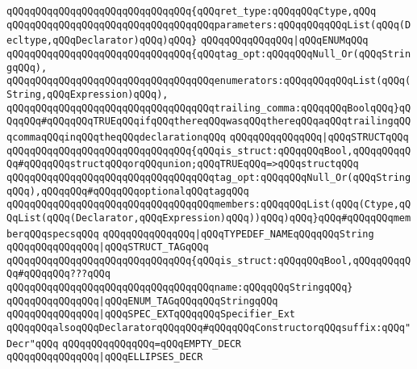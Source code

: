 \verb|qQQqqQQqqQQqqQQqqQQqqQQqqQQqqQQq{qQQqret_type:qQQqqQQqCtype,qQQq|\newline
\verb|qQQqqQQqqQQqqQQqqQQqqQQqqQQqqQQqqQQqparameters:qQQqqQQqqQQqList(qQQq(Decltype,qQQqDeclarator)qQQq)qQQq}|\newline
\verb|qQQqqQQqqQQqqQQq|\verb#|qQQqENUMqQQq#\newline
\verb|qQQqqQQqqQQqqQQqqQQqqQQqqQQqqQQq{qQQqtag_opt:qQQqqQQqNull_Or(qQQqStringqQQq),|\newline
\verb|qQQqqQQqqQQqqQQqqQQqqQQqqQQqqQQqqQQqenumerators:qQQqqQQqqQQqList(qQQq(String,qQQqExpression)qQQq),|\newline
\verb|qQQqqQQqqQQqqQQqqQQqqQQqqQQqqQQqqQQqtrailing_comma:qQQqqQQqBoolqQQq}qQQqqQQq#qQQqqQQqTRUEqQQqifqQQqthereqQQqwasqQQqthereqQQqaqQQqtrailingqQQqcommaqQQqinqQQqtheqQQqdeclarationqQQq|\newline
\verb|qQQqqQQqqQQqqQQq|\verb#|qQQqSTRUCTqQQq#\newline
\verb|qQQqqQQqqQQqqQQqqQQqqQQqqQQqqQQq{qQQqis_struct:qQQqqQQqBool,qQQqqQQqqQQq#qQQqqQQqstructqQQqorqQQqunion;qQQqTRUEqQQq=>qQQqstructqQQq|\newline
\verb|qQQqqQQqqQQqqQQqqQQqqQQqqQQqqQQqqQQqtag_opt:qQQqqQQqNull_Or(qQQqStringqQQq),qQQqqQQq#qQQqqQQqoptionalqQQqtagqQQq|\newline
\verb|qQQqqQQqqQQqqQQqqQQqqQQqqQQqqQQqqQQqmembers:qQQqqQQqList(qQQq(Ctype,qQQqList(qQQq(Declarator,qQQqExpression)qQQq))qQQq)qQQq}qQQq#qQQqqQQqmemberqQQqspecsqQQq|\newline
\verb|qQQqqQQqqQQqqQQq|\verb#|qQQqTYPEDEF_NAMEqQQqqQQqString#\newline
\verb|qQQqqQQqqQQqqQQq|\verb#|qQQqSTRUCT_TAGqQQq#\newline
\verb|qQQqqQQqqQQqqQQqqQQqqQQqqQQqqQQq{qQQqis_struct:qQQqqQQqBool,qQQqqQQqqQQq#qQQqqQQq???qQQq|\newline
\verb|qQQqqQQqqQQqqQQqqQQqqQQqqQQqqQQqqQQqname:qQQqqQQqStringqQQq}|\newline
\verb|qQQqqQQqqQQqqQQq|\verb#|qQQqENUM_TAGqQQqqQQqStringqQQq#\newline
\verb|qQQqqQQqqQQqqQQq|\verb#|qQQqSPEC_EXTqQQqqQQqSpecifier_Ext#\newline
\newline
\verb|qQQqqQQqalsoqQQqDeclaratorqQQqqQQq#qQQqqQQqConstructorqQQqsuffix:qQQq"Decr"qQQq|\newline
\verb|qQQqqQQqqQQqqQQq=qQQqEMPTY_DECR|\newline
\verb|qQQqqQQqqQQqqQQq|\verb#|qQQqELLIPSES_DECR#\newline
